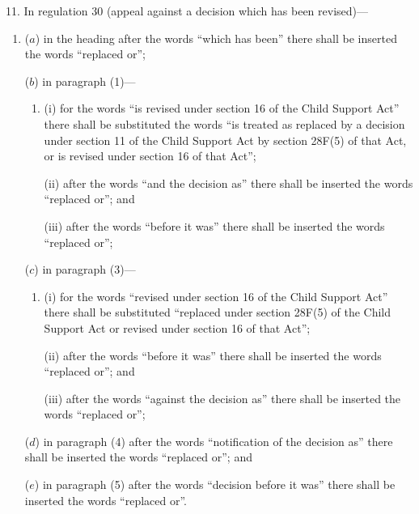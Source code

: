 \documentclass[12pt,a4paper]{article}
\begin{document}
11.  In regulation 30 (appeal against a decision which has been revised)—
\begin{enumerate}\item[]
($a$) in the heading after the words “which has been” there shall be inserted the words “replaced or”;

($b$) in paragraph (1)—
\begin{enumerate}\item[]
(i) for the words “is revised under section 16 of the Child Support Act” there shall be substituted the words “is treated as replaced by a decision under section 11 of the Child Support Act by section 28F(5) of that Act, or is revised under section 16 of that Act”;

(ii) after the words “and the decision as” there shall be inserted the words “replaced or”; and

(iii) after the words “before it was” there shall be inserted the words “replaced or”;
\end{enumerate}

($c$) in paragraph (3)—
\begin{enumerate}\item[]
(i) for the words “revised under section 16 of the Child Support Act” there shall be substituted “replaced under section 28F(5) of the Child Support Act or revised under section 16 of that Act”;

(ii) after the words “before it was” there shall be inserted the words “replaced or”; and

(iii) after the words “against the decision as” there shall be inserted the words “replaced or”;
\end{enumerate}

($d$) in paragraph (4) after the words “notification of the decision as” there shall be inserted the words “replaced or”; and

($e$) in paragraph (5) after the words “decision before it was” there shall be inserted the words “replaced or”.
\end{enumerate}
\end{document}
